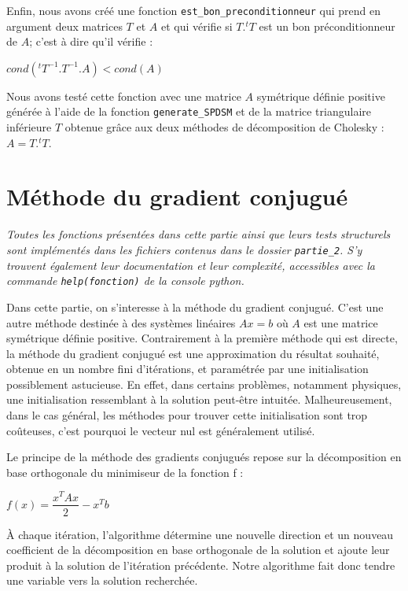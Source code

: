 \documentclass{article}
\begin{document}
Enfin, nous avons créé une fonction \texttt{est\_bon\_preconditionneur} qui prend en argument deux  matrices $T$ et $A$ et qui vérifie si $T.^tT$ est un bon préconditionneur de $A$; c'est à dire qu'il vérifie :
\begin{center}
  $\displaystyle{cond(^tT^{-1}.T^{-1}.A) < cond(A)}$
\end{center}
Nous avons testé cette fonction avec une matrice $A$ symétrique définie positive générée à l'aide de la fonction \texttt{generate\_SPDSM} et de la matrice triangulaire inférieure $T$ obtenue grâce aux deux méthodes de décomposition de Cholesky : $A = T.^tT$.

\section{Méthode du gradient conjugué}

\textit{Toutes les fonctions présentées dans cette partie ainsi que leurs tests structurels sont implémentés dans les fichiers contenus dans le dossier \texttt{partie\_2}. S'y trouvent également leur documentation et leur complexité, accessibles avec la commande \texttt{help(fonction)} de la console python.}
\vspace{10pt}

Dans cette partie, on s'interesse à la méthode du gradient conjugué. C'est une autre méthode destinée à des systèmes linéaires $Ax=b$ où  $A$ est une matrice symétrique définie positive. Contrairement à la première méthode qui est directe, la méthode du gradient conjugué est une approximation du résultat souhaité, obtenue en un nombre fini d'itérations, et paramétrée par une initialisation possiblement astucieuse. En effet, dans certains problèmes, notamment physiques, une initialisation ressemblant à la solution peut-être intuitée. Malheureusement, dans le cas général, les méthodes pour trouver cette initialisation sont trop coûteuses, c'est pourquoi le vecteur nul est généralement utilisé.

Le principe de la méthode des gradients conjugués repose sur la décomposition en base orthogonale du minimiseur de la fonction f : 
\begin{center}
  $\displaystyle{f(x) = \dfrac{x^TAx}{2} - x^Tb}$
\end{center}
À chaque itération, l'algorithme détermine une nouvelle direction et un nouveau coefficient de la décomposition en base orthogonale de la solution et ajoute leur produit à la solution de l'itération précédente. Notre algorithme fait donc tendre une variable vers la solution recherchée. 
\end{document}
